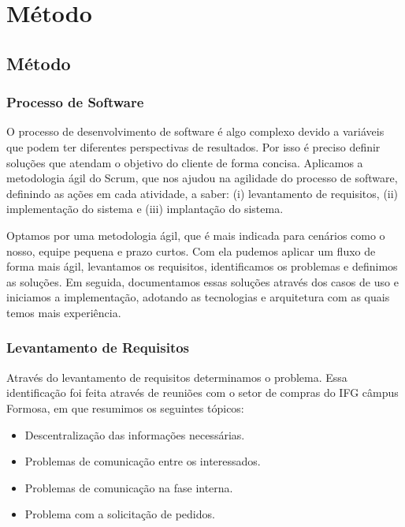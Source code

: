 \part{Método}

\chapter[Método]{Método}\label{Capitulo4}

\section{Processo de Software}

O processo de desenvolvimento de software é algo complexo devido a variáveis que podem ter diferentes perspectivas de resultados.
Por isso é preciso definir soluções que atendam o objetivo do cliente de forma concisa. 
Aplicamos a metodologia ágil do Scrum, que nos ajudou na agilidade do processo de software, definindo as ações em cada atividade, a saber: (i) levantamento de requisitos, (ii) implementação do sistema e (iii) implantação do sistema.

Optamos por uma metodologia ágil, que é mais indicada para cenários como o nosso, equipe pequena e prazo curtos.
Com ela pudemos aplicar um fluxo de forma mais ágil, levantamos os requisitos, identificamos os problemas e definimos as soluções.
Em seguida, documentamos essas soluções através dos casos de uso e iniciamos a implementação, adotando as tecnologias e arquitetura com as quais temos mais experiência.

\section{Levantamento de Requisitos}

Através do levantamento de requisitos determinamos o problema.
Essa identificação foi feita através de reuniões com o setor de compras do IFG câmpus Formosa, em que resumimos os seguintes tópicos:

\begin{itemize}
    \item Descentralização das informações necessárias.
    \item Problemas de comunicação entre os interessados.  
    \item Problemas de comunicação na fase interna.  
    \item Problema com a solicitação de pedidos.
\end{itemize}

